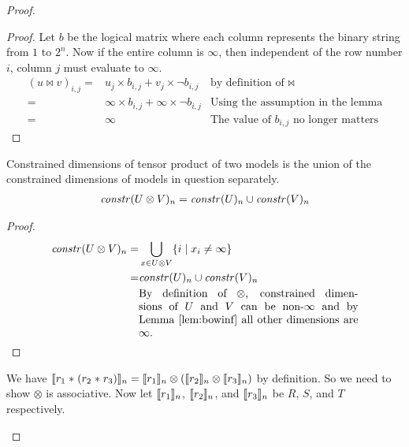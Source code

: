 \begin{proof}
\begin{description}
    \begin{proof}
      Let $b$ be the logical matrix where each column represents the binary
      string from $1$ to $2^n$. Now if the entire column is $\infty$, then
      independent of the row number $i$, column $j$ must evaluate to $\infty$.
      \begin{align*}
        (u \bowtie v)_{i,j} =& u_{j} \times b_{i,j} + v_{j} \times \neg b_{i,j}
                             & \mbox{by definition of $\bowtie$} \\
                            =& \infty \times b_{i,j} + \infty \times \neg b_{i,j}
                             & \mbox{Using the assumption in the lemma} \\
                            =& \infty
                             & \mbox{The value of $b_{i,j}$ no longer matters}
      \end{align*}
    \end{proof}

    \begin{lemma}\label{lem:tensordims}
      Constrained dimensions of tensor product of two models is the union of the
      constrained dimensions of models in question separately.
      \begin{align*}
        \mathit{constr}(U \otimes V)_{n} = \mathit{constr}(U)_{n} \cup \mathit{constr}(V)_{n} \\
      \end{align*}
    \end{lemma}

    \begin{proof}
      \begin{align}
        \effdims{U \otimes V}{n} = &
          \bigcup_{x \in U \otimes V} \{ i \;|\; x_i \neq \infty \} \\
        = & \effdims{U}{n} \cup \effdims{V}{n} \\
          & \parbox{7cm}{By definition of $\otimes$, constrained dimensions of
                         $U$ and $V$ can be non-$\infty$ and by
                         Lemma~\ref{lem:bowinf} all other dimensions are
                         $\infty$.} \\
      \end{align}
    \end{proof}
%
    We have $\llbracket{r_1 \; \texttt{$\ast$} \;
    (r_2 \; \texttt{$\ast$} \; r_3)}\rrbracket_n = \llbracket{r_1}\rrbracket_n \otimes (\llbracket{r_2}\rrbracket_n
    \otimes \llbracket{r_3}\rrbracket_n)$ by definition. So we need to show $\otimes$ is
    associative. Now let $\llbracket{r_1}\rrbracket_n$, $\llbracket{r_2}\rrbracket_n$, and
    $\llbracket{r_3}\rrbracket_n$ be $R$, $S$, and $T$ respectively.


\end{description}
\end{proof}
